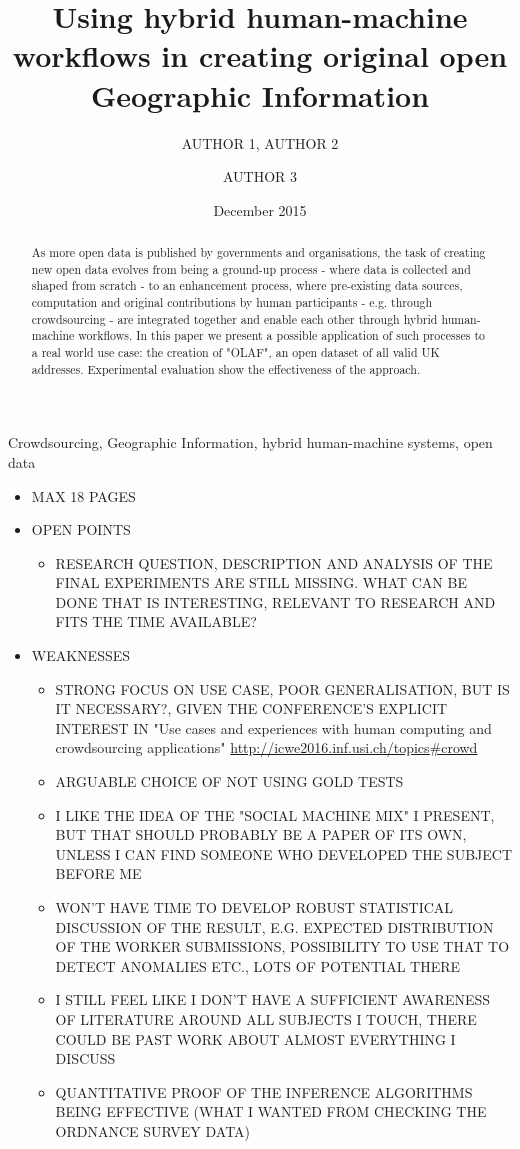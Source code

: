 \documentclass{llncs}
\title{Using hybrid human-machine workflows in creating original open Geographic Information}
\author{AUTHOR 1\inst{1}, AUTHOR 2\inst{1} \and AUTHOR 3\inst{2}}
\institute{INSTITUTE 1 \email{EMAIL FOR AUTHOR 1} \and INSTITUTE 2}
\date{December 2015}
\begin{document}
\maketitle

\begin{abstract}
As more open data is published by governments and organisations, the task of creating new open data evolves from being a ground-up process - where data is collected and shaped from scratch - to an enhancement process, where pre-existing data sources, computation and original contributions by human participants - e.g. through crowdsourcing - are integrated together and enable each other through hybrid human-machine workflows. In this paper we present a possible application of such processes to a real world use case: the creation of "OLAF", an open dataset of all valid UK addresses. Experimental evaluation show the effectiveness of the approach.
\end{abstract}

\begin{keywords}
Crowdsourcing, Geographic Information, hybrid human-machine systems, open data 
\end{keywords}

\begin{itemize}
    \item MAX 18 PAGES
    \item OPEN POINTS
        \begin{itemize}
            \item RESEARCH QUESTION, DESCRIPTION AND ANALYSIS OF THE FINAL EXPERIMENTS ARE STILL MISSING. WHAT CAN BE DONE THAT IS INTERESTING, RELEVANT TO RESEARCH AND FITS THE TIME AVAILABLE?
        \end{itemize}
    \item WEAKNESSES 
        \begin{itemize}
            \item STRONG FOCUS ON USE CASE, POOR GENERALISATION, BUT IS IT NECESSARY?, GIVEN THE CONFERENCE'S EXPLICIT INTEREST IN "Use cases and experiences with human computing and crowdsourcing applications" \url{http://icwe2016.inf.usi.ch/topics#crowd}
            \item ARGUABLE CHOICE OF NOT USING GOLD TESTS
            \item I LIKE THE IDEA OF THE "SOCIAL MACHINE MIX" I PRESENT, BUT THAT SHOULD PROBABLY BE A PAPER OF ITS OWN, UNLESS I CAN FIND SOMEONE WHO DEVELOPED THE SUBJECT BEFORE ME
            \item WON'T HAVE TIME TO DEVELOP ROBUST STATISTICAL DISCUSSION OF THE RESULT, E.G. EXPECTED DISTRIBUTION OF THE WORKER SUBMISSIONS, POSSIBILITY TO USE THAT TO DETECT ANOMALIES ETC., LOTS OF POTENTIAL THERE
            \item I STILL FEEL LIKE I DON'T HAVE A SUFFICIENT AWARENESS OF LITERATURE AROUND ALL SUBJECTS I TOUCH, THERE COULD BE PAST WORK ABOUT ALMOST EVERYTHING I DISCUSS
            \item QUANTITATIVE PROOF OF THE INFERENCE ALGORITHMS BEING EFFECTIVE (WHAT I WANTED FROM CHECKING THE ORDNANCE SURVEY DATA)
        \end{itemize}
\end{itemize}
\end{document}
